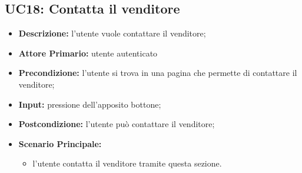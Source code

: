 \subsection{UC18: Contatta il venditore}
\label{sec:UC18}
\begin{itemize}
    \item \textbf{Descrizione:} l'utente vuole contattare il venditore;
    \item \textbf{Attore Primario:} utente autenticato
    \item \textbf{Precondizione:} l'utente si trova in una pagina che permette di contattare il venditore;
    \item \textbf{Input:} pressione dell'apposito bottone;
    \item \textbf{Postcondizione:} l'utente può contattare il venditore;
    \item \textbf{Scenario Principale:}
          \begin{itemize}
              \item l'utente contatta il venditore tramite questa sezione.
          \end{itemize}
\end{itemize}
